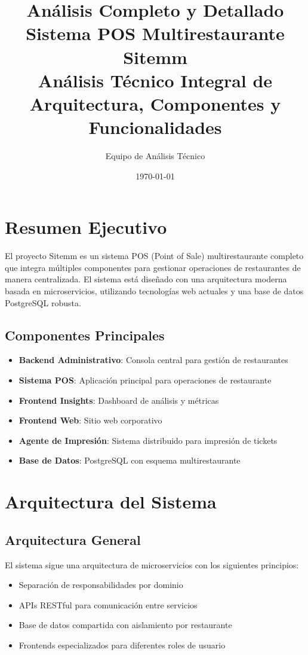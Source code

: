 \documentclass[12pt,a4paper]{article}
\title{\Huge\textbf{Análisis Completo y Detallado}\\
\Large\textbf{Sistema POS Multirestaurante Sitemm}\\
\vspace{0.5cm}
\large Análisis Técnico Integral de Arquitectura, Componentes y Funcionalidades}
\author{Equipo de Análisis Técnico}
\date{\today}
\begin{document}
\maketitle

\tableofcontents
\newpage

\section{Resumen Ejecutivo}

El proyecto Sitemm es un sistema POS (Point of Sale) multirestaurante completo que integra múltiples componentes para gestionar operaciones de restaurantes de manera centralizada. El sistema está diseñado con una arquitectura moderna basada en microservicios, utilizando tecnologías web actuales y una base de datos PostgreSQL robusta.

\subsection{Componentes Principales}
\begin{itemize}
    \item \textbf{Backend Administrativo}: Consola central para gestión de restaurantes
    \item \textbf{Sistema POS}: Aplicación principal para operaciones de restaurante
    \item \textbf{Frontend Insights}: Dashboard de análisis y métricas
    \item \textbf{Frontend Web}: Sitio web corporativo
    \item \textbf{Agente de Impresión}: Sistema distribuido para impresión de tickets
    \item \textbf{Base de Datos}: PostgreSQL con esquema multirestaurante
\end{itemize}

\section{Arquitectura del Sistema}

\subsection{Arquitectura General}
El sistema sigue una arquitectura de microservicios con los siguientes principios:
\begin{itemize}
    \item Separación de responsabilidades por dominio
    \item APIs RESTful para comunicación entre servicios
    \item Base de datos compartida con aislamiento por restaurante
    \item Frontends especializados para diferentes roles de usuario
\end{itemize}
\end{document}
